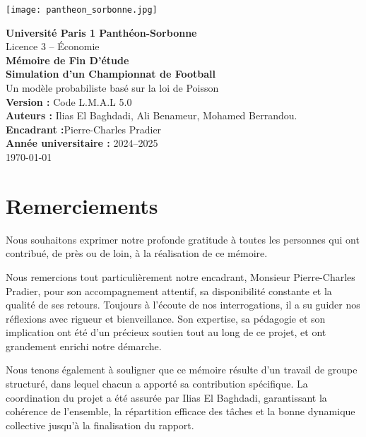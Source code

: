 \documentclass[12pt]{report}
\begin{document}
\begin{titlepage}
\centering

\vspace*{-2cm}
\texttt{[image: pantheon\_sorbonne.jpg]}
\vspace{1.5cm}

{\LARGE \textbf{Université Paris 1 Panth\'eon-Sorbonne}}\\[0.5em]
{\large Licence 3 -- \'Economie}\\[1.5em]

{\Huge \textbf{Mémoire de Fin D'étude}}\\[3em]

{\LARGE \textbf{Simulation d’un Championnat de Football}}\\[1em]

{\large Un modèle probabiliste basé sur la loi de Poisson}\\[1em]
\textbf{Version :} Code \textsc{L.M.A.L 5.0}\\[1em]

\textbf{Auteurs :} Ilias El Baghdadi, Ali Benameur, Mohamed Berrandou.\\
\textbf{Encadrant :}Pierre-Charles Pradier\\[2em]

\textbf{Ann\'ee universitaire :} 2024--2025\\

\vfill
    \today
\end{titlepage}

\chapter*{Remerciements}

Nous souhaitons exprimer notre profonde gratitude à toutes les personnes qui ont contribué, de près ou de loin, à la réalisation de ce mémoire.

Nous remercions tout particulièrement notre encadrant, Monsieur Pierre-Charles Pradier, pour son accompagnement attentif, sa disponibilité constante et la qualité de ses retours. Toujours à l’écoute de nos interrogations, il a su guider nos réflexions avec rigueur et bienveillance. Son expertise, sa pédagogie et son implication ont été d’un précieux soutien tout au long de ce projet, et ont grandement enrichi notre démarche.

Nous tenons également à souligner que ce mémoire résulte d’un travail de groupe structuré, dans lequel chacun a apporté sa contribution spécifique. La coordination du projet a été assurée par Ilias El Baghdadi, garantissant la cohérence de l’ensemble, la répartition efficace des tâches et la bonne dynamique collective jusqu’à la finalisation du rapport.
\end{document}
